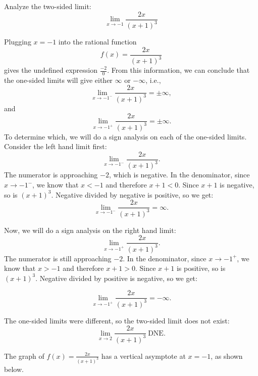 \documentclass{ximera}
\begin{document}
\begin{example}[example 4]
Analyze the two-sided limit:
\[
\lim_{x\to -1} 
\frac{2x}{(x+1)^3}
\]

Plugging $x = -1$ into the rational function
\[f(x) = \frac{2x}{(x+1)^3}\]
gives the undefined expression $\frac{-2}{0}$. From this information, we can conclude 
that the one-sided limits
will give either $\infty$ or $-\infty$, i.e., 
\[\lim_{x \to -1^-} \frac{2x}{(x+1)^3}= \pm \infty,\]
and
\[\lim_{x \to -1^+} \frac{2x}{(x+1)^3}= \pm \infty.\]
To determine which, we will do a sign analysis on each of the one-sided limits. 
Consider the left hand limit first:
\[\lim_{x \to -1^-} \frac{2x}{(x+1)^3}.\]
The numerator is approaching $-2$, which is negative. In the denominator, since $x \to -1^-$, 
we know that $x<-1$ and therefore $x+1 <0$. Since $x+1$ is negative, so is $(x+1)^3$. Negative divided by 
negative is positive, so we get:
\[
\lim_{x \to -1^-} \frac{2x}{(x+1)^3} = \infty.
\]

Now, we will do a sign analysis on the right hand limit:
\[\lim_{x \to -1^+} \frac{2x}{(x+1)^3}.\]
The numerator is still approaching $-2$. In the denominator, since $x \to -1^+$, 
we know that $x>-1$ and therefore $x+1 >0$. Since $x+1$ is positive, so is $(x+1)^3$. Negative divided by 
positive is negative, so we get:

\[
\lim_{x \to -1^+} \frac{2x}{(x+1)^3} = -\infty.
\]

The one-sided limits were different, so the two-sided limit does not exist:
\[\lim_{x \to 2} \frac{2x}{(x+1)^3} \ \text{DNE}.\]

The graph of $f(x) = \frac{2x}{(x+1)^3}$ has a vertical asymptote at $x = -1$, as shown below.

\begin{center}
\end{center}
\end{example}
\end{document}
